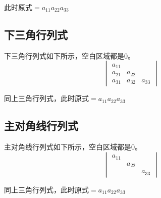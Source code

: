 \documentclass[UTF8, 12pt]{article} %
\begin{document}
此时原式$=a_{11}a_{22}a_{33}$

\subsection{下三角行列式}
下三角行列式如下所示，空白区域都是0。
$$
\begin{vmatrix}
    a_{11}&        &        \\
    a_{21}&a_{22}  &        \\
    a_{31}&a_{32}  &a_{33}
\end{vmatrix}
$$

同上三角行列式，此时原式$=a_{11}a_{22}a_{33}$

\subsection{主对角线行列式}
主对角线行列式如下所示，空白区域都是0。
$$
\begin{vmatrix}
    a_{11}&        &        \\
          &a_{22}  &        \\
          &        &a_{33}
\end{vmatrix}
$$

同上三角行列式，此时原式$=a_{11}a_{22}a_{33}$
\end{document}
